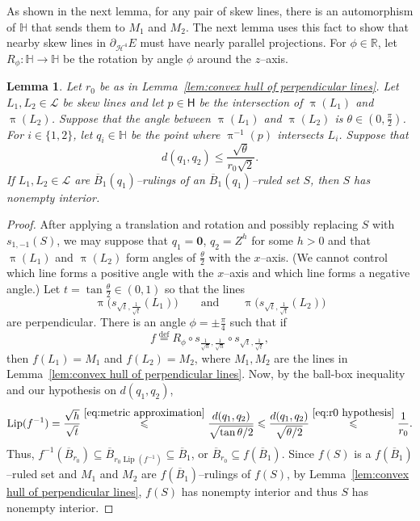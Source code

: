 \documentclass[11pt,reqno]{amsart}
\renewcommand{\H}{\mathbb{H}}
\newcommand{\R}{\mathbb{R}}
\newcommand{\cH}{\mathcal{H}}
\newcommand{\cL}{\mathcal{L}}
\newcommand{\0}{\mathbf{0}}
\renewcommand{\1}{\mathbf 1}
\newcommand{\from}{\colon}
\renewcommand{\subset}{\subseteq}
\newcommand{\eqdef}{\stackrel{\mathrm{def}}{=}}
\renewcommand{\le}{\leqslant}
\newtheorem{lemma}[thm]{Lemma}
\theoremstyle{remark}
\DeclareMathOperator{\Lip}{Lip}
\begin{document}
As shown in the next lemma, for any pair of skew lines, there is an automorphism of $\H$ that sends them to $M_1$ and $M_2$.  The next lemma uses this fact to show that nearby skew lines in $\partial_{\cH^4} E$ must have nearly parallel projections.  For $\phi\in\R$, let $R_\phi\from \H\to \H$ be the rotation by angle $\phi$ around the $z$--axis.
\begin{lemma}\label{lem:convex hull of skew lines}
  Let $r_0$ be as in Lemma~\ref{lem:convex hull of perpendicular lines}.  Let $L_1,L_2\in \cL$ be skew lines and let $p\in \mathsf{H}$ be the intersection of $\uppi(L_1)$ and $\uppi(L_2)$.  Suppose that the angle between $\uppi(L_1)$ and $\uppi(L_2)$ is $\theta\in (0,\frac{\pi}{2})$. For $i\in \{1,2\}$, let $q_i\in \H$ be the point where $\uppi^{-1}(p)$ intersects $L_i$.  Suppose that
  \begin{equation}\label{eq:r0 hypothesis}
    d(q_1,q_2) \le \frac{\sqrt{\theta}}{r_0\sqrt{2}}.
  \end{equation}
If $L_1,L_2\in \cL$ are $\overline{B}_1(q_1)$--rulings of an $\overline{B}_1(q_1)$--ruled set $S$, then $S$ has nonempty interior.
\end{lemma}

\begin{proof}
  After applying a translation and rotation and possibly replacing $S$ with $s_{1,-1}(S)$, we may suppose that $q_1=\mathbf{0}$, $q_2=Z^{h}$ for some $h>0$ and that $\uppi(L_1)$ and $\uppi(L_2)$ form angles of $\frac{\theta}{2}$ with the $x$--axis.  (We cannot control which line forms a positive angle with the $x$--axis and which line forms a negative angle.)  Let $t=\tan\frac{\theta}{2}\in (0,1)$ so that the lines
  $$\uppi\Big(s_{\sqrt{t}, \frac{1}{\sqrt{t}}}(L_1)\Big)\qquad \mathrm{and}\qquad  \uppi\Big(s_{\sqrt{t}, \frac{1}{\sqrt{t}}}(L_2)\Big)$$
  are perpendicular.  There is an angle $\phi=\pm \frac{\pi}{4}$ such that if
  $$f\eqdef R_\phi\circ s_{\frac{1}{\sqrt{h}}, \frac{1}{\sqrt{h}}}\circ s_{\sqrt{t}, \frac{1}{\sqrt{t}}},$$
  then $f(L_1)=M_1$ and $f(L_2)=M_2$, where $M_1,M_2$ are the lines in Lemma~\ref{lem:convex hull of perpendicular lines}.  Now, by the ball-box inequality and our hypothesis on $d(q_1,q_2)$,
  $$\Lip(f^{-1})=\frac{\sqrt{h}}{\sqrt{t}} \stackrel{\eqref{eq:metric approximation}}{\le} \frac{d(q_1,q_2)}{\sqrt{\tan \theta/2}}\le \frac{d(q_1,q_2)}{\sqrt{\theta/2}} \stackrel{\eqref{eq:r0 hypothesis}}{\le} \frac{1}{r_0}.$$
  Thus, $f^{-1}(\overline{B}_{r_0})\subset \overline{B}_{r_0 \Lip(f^{-1})}\subset \overline{B}_1$, or $\overline{B}_{r_0}\subset f(\overline{B}_1)$. Since $f(S)$ is a $f(\overline{B}_1)$--ruled set and $M_1$ and $M_2$ are $f(\overline{B}_1)$--rulings of $f(S)$, by Lemma~\ref{lem:convex hull of perpendicular lines}, $f(S)$ has nonempty interior and thus $S$ has nonempty interior.
\end{proof}
\end{document}
